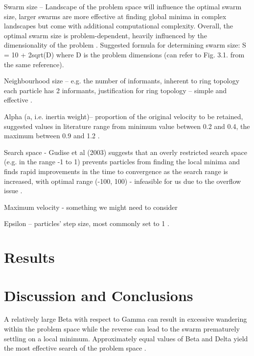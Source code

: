 \documentclass[12pt]{article}
\begin{document}
Swarm size – Landscape of the problem space will influence the optimal swarm size, larger swarms are more effective at finding global minima in complex landscapes but come with additional computational complexity. Overall, the optimal swarm size is problem-dependent, heavily influenced by the dimensionality of the problem \cite{Razee}. Suggested formula for determining swarm size: S = 10 + 2sqrt(D) where D is the problem dimensions (can refer to Fig. 3.1. from the same reference)\cite{Clerc}.

Neighbourhood size – e.g. the number of informants, inherent to ring topology each particle has 2 informants, justification for ring topology – simple and effective \cite{Clerc}.

Alpha (a, i.e. inertia weight)– proportion of the original velocity to be retained, suggested values in literature range from minimum value between 0.2 and 0.4, the maximum between 0.9 and 1.2 \cite{Razee} \cite{Gudise}.

Search space - Gudise et al (2003) suggests that an overly restricted search space (e.g. in the range -1 to 1) prevents particles from finding the local minima and finds rapid improvements in the time to convergence as the search range is increased, with  optimal range (-100, 100) - infeasible for us due to the overflow issue \cite{Gudise}.

Maximum velocity - something we might need to consider

Epsilon – particles' step size, most commonly set to 1 \cite{Luke}.


\vspace{-1.5em}
\section{Results}



\vspace{-1.5em}
\section{Discussion and Conclusions}
\vspace{-1.5em}

A relatively large Beta with respect to Gamma can result in excessive wandering within the problem space while the reverse  can lead to the swarm prematurely settling on a local minimum. Approximately equal values of Beta and Delta yield the most effective search of the problem space \cite{Kennedy}.
\end{document}
